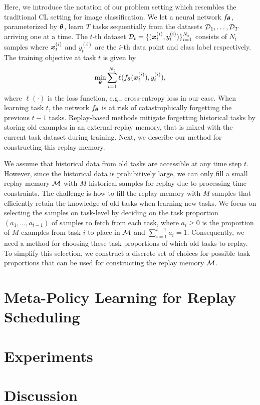 Here, we introduce the notation of our problem setting which resembles the traditional CL setting for image classification. We let a neural network $f_{{\bm{\theta}}}$, parameterized by ${\bm{\theta}}$, learn $T$ tasks sequentially from the datasets ${\mathcal{D}}_1, \dots, {\mathcal{D}}_T$ arriving one at a time. %
The $t$-th dataset ${\mathcal{D}}_t = \{({\bm{x}}_{t}^{(i)}, y_{t}^{(i)})\}_{i=1}^{N_{t}}$ consists of $N_t$ samples where ${\bm{x}}_{t}^{(i)}$ and $y_{t}^{(i)}$ are the $i$-th data point and class label respectively. The training objective at task $t$ is given by 
\begin{align}
	\underset{{\bm{\theta}}}{\text{min}} \sum_{i=1}^{N_t} \ell(f_{{\bm{\theta}}}({\bm{x}}_t^{(i)}), y_{t}^{(i)}),
\end{align}
where $\ell(\cdot)$ is the loss function, e.g., cross-entropy loss in our case. 
When learning task $t$, the network $f_{{\bm{\theta}}}$ is at risk of catastrophically forgetting the previous $t-1$ tasks.  
Replay-based methods mitigate forgetting historical tasks by storing old examples in an external replay memory, that is mixed with the current task dataset during training. 
Next, we describe our method for constructing this replay memory.  

We assume that historical data from old tasks are accessible at any time step $t$. However, since the historical data is prohibitively large, we can only fill a small replay memory ${\mathcal{M}}$ with $M$ historical samples for replay due to processing time constraints. 
The challenge is how to fill the replay memory with $M$ samples that efficiently retain the knowledge of old tasks when learning new tasks. We focus on selecting the samples on task-level by deciding on the task proportion $(a_1, \dots, a_{t-1})$ of samples to fetch from each task, where $a_{i} \geq 0$ is the proportion of $M$ examples from task $i$ to place in ${\mathcal{M}}$ and $\sum_{i=1}^{t-1} a_i = 1$. Consequently, we need a method for choosing these task proportions of which old tasks to replay. 
To simplify this selection, we construct a discrete set of choices for possible task proportions that can be used for constructing the replay memory ${\mathcal{M}}$.

\section{Meta-Policy Learning for Replay Scheduling}
\section{Experiments}
\section{Discussion}



